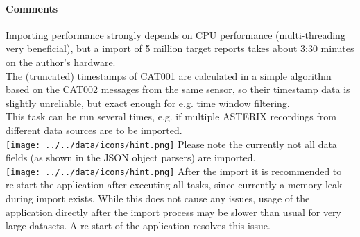 \paragraph{Comments}
Importing performance strongly depends on CPU performance (multi-threading very beneficial), but a import of 5 million target reports takes about 3:30 minutes on the author's hardware. \\

The (truncated) timestamps of CAT001 are calculated in a simple algorithm based on the CAT002 messages from the same sensor, so their timestamp data is slightly unreliable, but exact enough for e.g. time window filtering. \\

This task can be run several times, e.g. if multiple ASTERIX recordings from different data sources are to be imported. \\

\texttt{[image: ../../data/icons/hint.png]} Please note the currently not all data fields (as shown in the JSON object parsers) are imported.\\

\texttt{[image: ../../data/icons/hint.png]} After the import it is recommended to re-start the application after executing all tasks, since currently a memory leak during import exists. While this does not cause any issues, usage of the application directly after the import process may be slower than usual for very large datasets. A re-start of the application resolves this issue. \\ 
